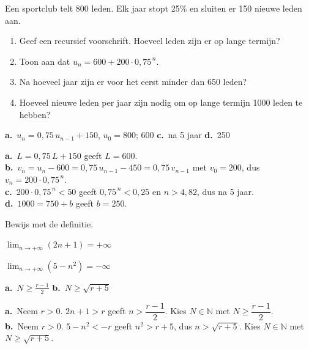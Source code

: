 \begin{oefeningen}
\begin{oefening}[2]
Een sportclub telt 800 leden. Elk jaar stopt 25\% en sluiten er 150 nieuwe leden aan.
\begin{enumerate}
  \item Geef een recursief voorschrift. Hoeveel leden zijn er op lange termijn?
  \item Toon aan dat $u_n = 600 + 200 \cdot 0{,}75^{\,n}$.
  \item Na hoeveel jaar zijn er voor het eerst minder dan 650 leden?
  \item Hoeveel nieuwe leden per jaar zijn nodig om op lange termijn 1000 leden te hebben?
\end{enumerate}
\begin{solution}
\textbf{a.}~$u_n=0{,}75\,u_{n-1}+150$, $u_0=800$; 600 \quad \textbf{c.}~na 5 jaar \quad \textbf{d.}~250
\end{solution}
\begin{fullsolution}
\textbf{a.}~$L=0{,}75\,L+150$ geeft $L=600$.\\
\textbf{b.}~$v_n=u_n-600=0{,}75\,u_{n-1}-450=0{,}75\,v_{n-1}$ met $v_0=200$, dus $v_n=200\cdot 0{,}75^{\,n}$.\\
\textbf{c.}~$200\cdot 0{,}75^{\,n}<50$ geeft $0{,}75^{\,n}<0{,}25$ en $n>4{,}82$, dus na 5 jaar.\\
\textbf{d.}~$1000=750+b$ geeft $b=250$.
\end{fullsolution}
\end{oefening}

\begin{oefening}[2]
Bewijs met de definitie.
\begin{reeks}[2]
  \item $\displaystyle\lim_{n\to+\infty} (2n + 1) = +\infty$
  \item $\displaystyle\lim_{n\to+\infty} (5 - n^2) = -\infty$
\end{reeks}
\begin{solution}
\textbf{a.}~$N\geqslant\tfrac{r-1}{2}$ \quad \textbf{b.}~$N\geqslant\sqrt{r+5}$
\end{solution}
\begin{fullsolution}
\textbf{a.}~Neem $r>0$. $2n+1>r$ geeft $n>\dfrac{r-1}{2}$. Kies $N\in\mathbb{N}$ met $N\geqslant\dfrac{r-1}{2}$.\\
\textbf{b.}~Neem $r>0$. $5-n^2<-r$ geeft $n^2>r+5$, dus $n>\sqrt{r+5}$. Kies $N\in\mathbb{N}$ met $N\geqslant\sqrt{r+5}$.
\end{fullsolution}
\end{oefening}


\end{oefeningen}
